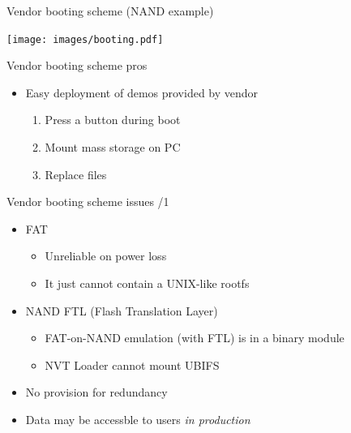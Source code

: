 \documentclass[xetex,table,aspectratio=169]{beamer}
\begin{document}
\begin{frame}{Vendor booting scheme (NAND example)}
  \begin{center}
    \texttt{[image: images/booting.pdf]}
  \end{center}
\end{frame}

\begin{frame}{Vendor booting scheme pros}
  \begin{itemize}
  \item Easy deployment of demos provided by vendor
    \begin{enumerate}
    \item Press  a button during boot
    \item Mount mass storage on PC
    \item Replace files
    \end{enumerate}
  \end{itemize}
\end{frame}

\begin{frame}{Vendor booting scheme issues /1}
  \begin{itemize}
  \item FAT
    \begin{itemize}
    \item Unreliable on power loss
    \item It just cannot contain a UNIX-like rootfs
    \end{itemize}
  \item NAND FTL (Flash Translation Layer)
    \begin{itemize}
    \item FAT-on-NAND emulation (with FTL) is in a binary module
    \item NVT Loader cannot mount UBIFS
  \end{itemize}
  \item No provision for redundancy
  \item Data may be accessble to users {\em in production}
  \end{itemize}
\end{frame}
\end{document}
